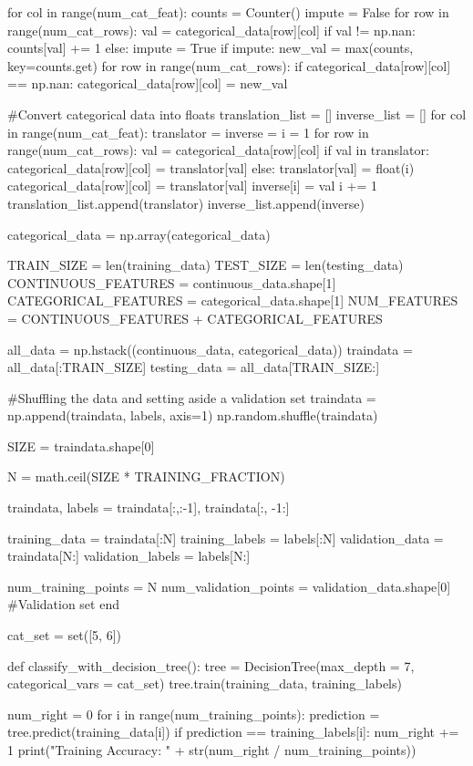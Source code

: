 \documentclass{article}
\begin{document}
\begin{python}
for col in range(num_cat_feat):
    counts = Counter()
    impute = False
    for row in range(num_cat_rows):
        val = categorical_data[row][col]
        if val != np.nan:
            counts[val] += 1
        else:
            impute = True
    if impute:
        new_val = max(counts, key=counts.get)
        for row in range(num_cat_rows):
            if categorical_data[row][col] == np.nan:
                categorical_data[row][col] = new_val

#Convert categorical data into floats
translation_list = []
inverse_list = []
for col in range(num_cat_feat):
    translator = {}
    inverse = {}
    i = 1
    for row in range(num_cat_rows):
        val = categorical_data[row][col]
        if val in translator:
            categorical_data[row][col] = translator[val]
        else:
            translator[val] = float(i)
            categorical_data[row][col] = translator[val]
            inverse[i] = val
            i += 1
    translation_list.append(translator)
    inverse_list.append(inverse)

categorical_data = np.array(categorical_data)

TRAIN_SIZE = len(training_data)
TEST_SIZE = len(testing_data)
CONTINUOUS_FEATURES = continuous_data.shape[1]
CATEGORICAL_FEATURES = categorical_data.shape[1]
NUM_FEATURES = CONTINUOUS_FEATURES + CATEGORICAL_FEATURES

all_data = np.hstack((continuous_data, categorical_data))
traindata = all_data[:TRAIN_SIZE]
testing_data = all_data[TRAIN_SIZE:]

#Shuffling the data and setting aside a validation set
traindata = np.append(traindata, labels, axis=1)
np.random.shuffle(traindata)

SIZE = traindata.shape[0]

N = math.ceil(SIZE * TRAINING_FRACTION)

traindata, labels = traindata[:,:-1], traindata[:, -1:]

training_data = traindata[:N]
training_labels = labels[:N]
validation_data = traindata[N:]
validation_labels = labels[N:]

num_training_points = N
num_validation_points = validation_data.shape[0]
#Validation set end

cat_set = set([5, 6])

def classify_with_decision_tree():
    tree = DecisionTree(max_depth = 7, categorical_vars = cat_set)
    tree.train(training_data, training_labels)

    num_right = 0
    for i in range(num_training_points):
        prediction = tree.predict(training_data[i])
        if prediction == training_labels[i]:
            num_right += 1
    print("Training Accuracy: " + str(num_right / num_training_points))


\end{python}
\end{document}
